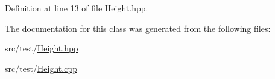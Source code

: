 Definition at line 13 of file Height.\-hpp.



The documentation for this class was generated from the following files\-:\begin{DoxyCompactItemize}
\item 
src/test/\hyperlink{Height_8hpp}{Height.\-hpp}\item 
src/test/\hyperlink{Height_8cpp}{Height.\-cpp}\end{DoxyCompactItemize}
